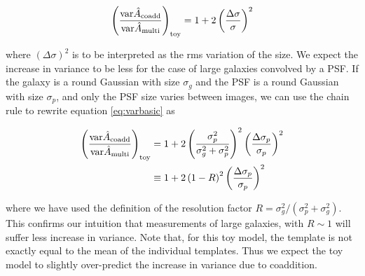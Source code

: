 \documentclass[fleqn,useAMS,usenatbib]{mnras}
\newcommand{\coadd}{{\rm coadd}}
\begin{document}
\begin{align} \label{eq:varbasic}
\left( \frac{ {\rm var} \hat{A}_\coadd }{{\rm var} \hat{A}_{\rm multi} } 
\right)_{\rm toy} = 
1 + 2 \left( \frac{\Delta \sigma}{\sigma} \right)^2
\end{align}

where $(\Delta \sigma)^2$ is to be interpreted as the rms variation of the size.
We expect the increase in variance to be less for the case
of large galaxies convolved by a PSF.  If the galaxy is a round Gaussian with
size $\sigma_g$ and the PSF is a round Gaussian with size $\sigma_p$,
and only the PSF size varies between images,
we can use the chain rule to rewrite equation \ref{eq:varbasic} as

\begin{align} \label{eq:vargal_appendix}
\left( \frac{ {\rm var} \hat{A}_\coadd }{{\rm var} \hat{A}_{\rm multi} } 
\right)_{\rm toy} &= 
1 + 2 \left( \frac{\sigma_p^2}{\sigma_g^2 + \sigma_p^2}\right)^2 \left( 
\frac{\Delta \sigma_p}{\sigma_p} \right)^2 \\
&\equiv 1 + 2 \left( 1 - R \right)^2 \left( \frac{\Delta 
\sigma_p}{\sigma_p} \right)^2
\end{align}

where we have used the definition of the resolution factor $R =
\sigma_g^2/(\sigma_p^2 + \sigma_g^2)$.  This confirms our
intuition that measurements of large galaxies, with $R \sim 1$ will suffer
less increase in variance.
Note that, for this toy model, the template is not exactly equal to the mean of
the individual templates.  Thus we expect the toy model to slightly
over-predict the increase in variance due to coaddition.
\end{document}
